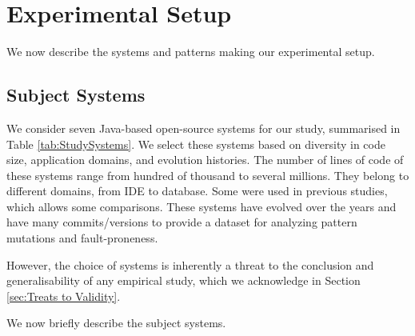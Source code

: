 \section{Experimental Setup}
\label{sec:expSetup}

We now describe the systems and patterns making our experimental setup.



\subsection{Subject Systems} 
\label{ssec:section4.1}

We consider seven Java-based open-source systems for our study, summarised in Table \ref{tab:StudySystems}. We select these systems based on diversity in code size, application domains, and evolution histories. The number of lines of code of these systems range from hundred of thousand to several millions. They belong to different domains, from IDE to database. Some were used in previous studies, which allows some comparisons. These systems have evolved over the years and have many commits/versions to provide a dataset for analyzing pattern mutations and fault-proneness.

However, the choice of systems is inherently a threat to the conclusion and generalisability of any empirical study, which we acknowledge in Section \ref{sec:Treats to Validity}. 

We now briefly describe the subject systems.

\begin{table*} [ht]
\centering
\caption{Analyzed systems}
\label{tab:StudySystems}
\end{table*}

